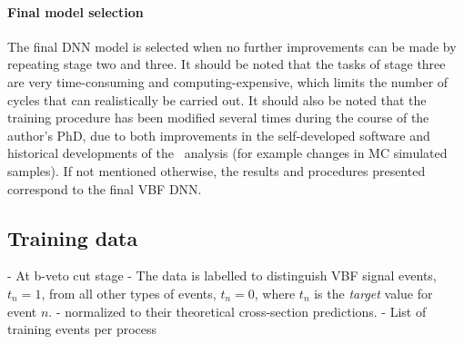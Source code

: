 \paragraph{Final model selection}
The final DNN model is selected when no further improvements can be made by repeating stage two and three. It should be noted that the tasks of stage three are very time-consuming and computing-expensive, which limits the number of cycles that can realistically be carried out.
It should also be noted that the training procedure has been modified several times during the course of the author's PhD, due to both improvements in the self-developed software and historical developments of the \HWW\ analysis (for example changes in MC simulated samples). If not mentioned otherwise, the results and procedures presented correspond to the final VBF DNN. 





\subsection{Training data}
\label{subsec:training-data}
- At b-veto cut stage
- The data is labelled to distinguish VBF signal events, $t_n = 1$, from all other types of events, $t_n = 0$, where $t_n$ is the \emph{target} value for event $n$.
- normalized to their theoretical cross-section predictions.
- List of training events per process



